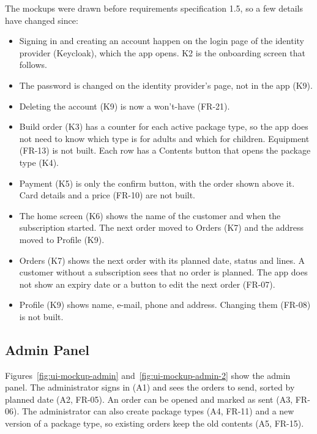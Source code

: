 \documentclass[a4paper,11pt]{article}
\begin{document}
The mockups were drawn before requirements specification 1.5, so a few details have changed since:
\begin{itemize}
    \item Signing in and creating an account happen on the login page of the identity provider (Keycloak), which the app opens. K2 is the onboarding screen that follows.
    \item The password is changed on the identity provider's page, not in the app (K9).
    \item Deleting the account (K9) is now a won't-have (FR-21).
    \item Build order (K3) has a counter for each active package type, so the app does not need to know which type is for adults and which for children. Equipment (FR-13) is not built. Each row has a Contents button that opens the package type (K4).
    \item Payment (K5) is only the confirm button, with the order shown above it. Card details and a price (FR-10) are not built.
    \item The home screen (K6) shows the name of the customer and when the subscription started. The next order moved to Orders (K7) and the address moved to Profile (K9).
    \item Orders (K7) shows the next order with its planned date, status and lines. A customer without a subscription sees that no order is planned. The app does not show an expiry date or a button to edit the next order (FR-07).
    \item Profile (K9) shows name, e-mail, phone and address. Changing them (FR-08) is not built.
\end{itemize}

\subsection{Admin Panel}
Figures~\ref{fig:ui-mockup-admin} and~\ref{fig:ui-mockup-admin-2} show the admin panel. The administrator signs in (A1) and sees the orders to send, sorted by planned date (A2, FR-05). An order can be opened and marked as sent (A3, FR-06). The administrator can also create package types (A4, FR-11) and a new version of a package type, so existing orders keep the old contents (A5, FR-15).

\end{document}
